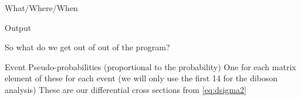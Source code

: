 {\begin{block}{What/Where/When}
\begin{itemize}
{\begin{itemize}
        \end{itemize}
      }
    \end{itemize}
  \end{block}
  \vspace*{-0.15cm}
  \begin{block}{Output}
    \begin{itemize}
      \myitem So what do we get out of out of the program?
      \begin{itemize}
        \myitemtwo Event Pseudo-probabilities (proportional to the probability)
        \myitemtwo One for each matrix element
         of these for each event (we will only use the
        first 14 for the diboson analysis)
        \myitemtwo These are our differential cross sections from \eqref{eq:dsigma2}
      \end{itemize}
    \end{itemize}
  \end{block}
}
